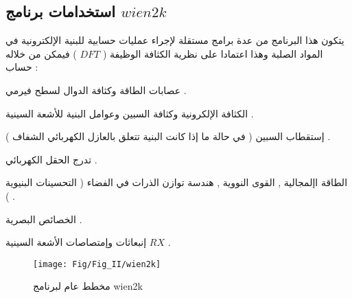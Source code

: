 \subsection{  استخدامات برنامج $ wien2k $ }

يتكون هذا البرنامج من عدة  برامج مستقلة لإجراء عمليات حسابية للبنية الإلكترونية في المواد الصلبة وهذا اعتمادا على نظرية الكثافة الوظيفة ( $ DFT $ ) فيمكن من خلاله حساب  :
\begin{list}{}{}
	\item 
	عصابات الطاقة وكثافة الدوال لسطح فيرمي .
	\item 
	الكثافة الإلكرونية وكثافة السبين وعوامل البنية للأشعة السينية .
	\item 
	إستقطاب السبين ( في حالة ما إذا كانت البنية تتعلق بالعازل الكهربائي الشفاف ) .
	\item 
	تدرج الحقل الكهربائي .
	\item 
	الطاقة اإلمجالية , القوى النووية , هندسة توازن الذرات في الفضاء ( التحسينات البنيوية ) .
	\item 
	الخصائص البصرية .
	\item 
	إنبعاثات وإمتصاصات الأشعة السينية $ RX $ .
\end{list}

\begin{figure}[h!]
	\centering
	\texttt{[image: Fig/Fig\_II/wien2k]}
	\caption{مخطط عام لبرنامج wien2k  }
	\label{fig:wien2k}
\end{figure}
\FloatBarrier

